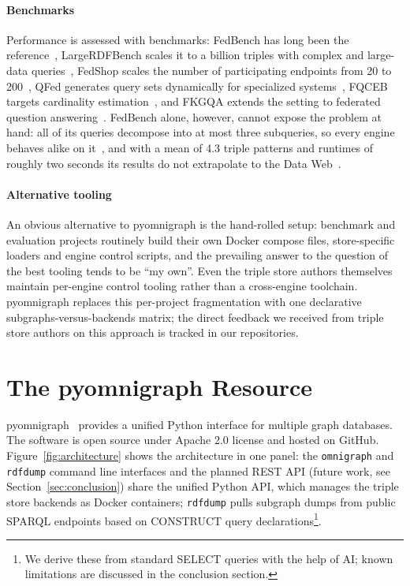 \documentclass[
]{ceurart}
\newcommand{\tquote}[1]{``#1''}
\begin{document}
\paragraph{Benchmarks}
Performance is assessed with benchmarks: FedBench has long been the reference~\cite{schmidt_fedbench_2011}, LargeRDFBench scales it to a billion triples with complex and large-data queries~\cite{saleem_largerdfbench_2018}, FedShop scales the number of participating endpoints from 20 to 200~\cite{dang_fedshop_2023}, QFed generates query sets dynamically for specialized systems~\cite{rakhmawati_qfed_2014}, FQCEB targets cardinality estimation~\cite{xu_evaluation_2023}, and FKGQA extends the setting to federated question answering~\cite{dobriy_agentic_2026}.
 FedBench alone, however, cannot expose the problem at hand: all of its queries decompose into at most three subqueries, so every engine behaves alike on it~\cite{vidal_selection_2016}, and with a mean of 4.3 triple patterns and runtimes of roughly two seconds its results do not extrapolate to the Data Web~\cite{saleem_largerdfbench_2018}.

\paragraph{Alternative tooling}
An obvious alternative to pyomnigraph is the hand-rolled setup: benchmark and evaluation projects routinely build their own Docker compose files, store-specific loaders and engine control scripts, and the prevailing answer to the question of the best tooling tends to be \tquote{my own}. Even the triple store authors themselves maintain per-engine control tooling rather than a cross-engine toolchain. pyomnigraph replaces this per-project fragmentation with one declarative subgraphs-versus-backends matrix; the direct feedback we received from triple store authors on this approach is tracked in our repositories.

\section{The pyomnigraph Resource}\label{sec:resource}
pyomnigraph~\cite{pyomnigraph} provides a unified Python interface for multiple graph databases. The software is open source under Apache 2.0 license and hosted on GitHub.
Figure~\ref{fig:architecture} shows the architecture in one panel: the \texttt{omnigraph} and \texttt{rdfdump} command line interfaces and the planned REST API (future work, see Section~\ref{sec:conclusion}) share the unified Python API, which manages the triple store backends as Docker containers; \texttt{rdfdump} pulls subgraph dumps from public SPARQL endpoints based on CONSTRUCT query declarations\footnote{We derive these from standard SELECT queries with the help of AI; known limitations are discussed in the conclusion section.}.
\end{document}
